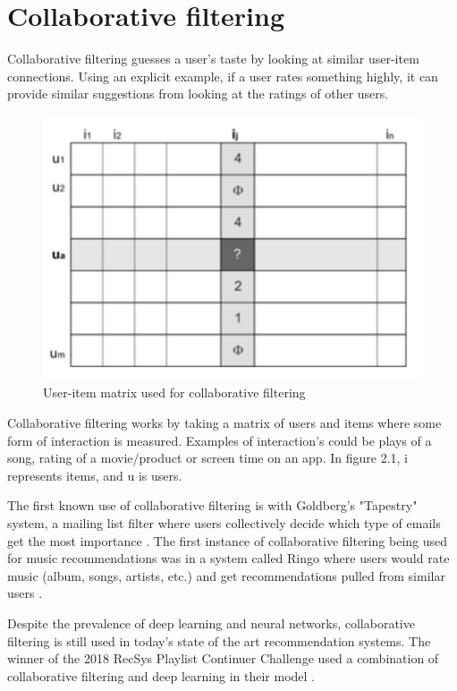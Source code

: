 \section{Collaborative filtering}

Collaborative filtering guesses a user's taste by looking at similar user-item connections. Using an explicit example, if a user rates something highly, it can provide similar suggestions from looking at the ratings of other users\citep{celma_recommendation_2010}.

\begin{figure}[H]
	\includegraphics[scale=0.65]{images/collaborative_filtering}
	\centering
	\caption{User-item matrix used for collaborative filtering \citep{celma_recommendation_2010}} 
	\label{fig:figure}
\end{figure}

Collaborative filtering works by taking a matrix of users and items where some form of interaction is measured. Examples of interaction's could be plays of a song, rating of a movie/product or screen time on an app. In figure 2.1, i represents items, and u is users.

The first known use of collaborative filtering is with Goldberg's "Tapestry" system, a mailing list filter where users collectively decide which type of emails get the most importance \citep{goldberg_using_1992}. The first instance of collaborative filtering being used for music recommendations was in a system called Ringo where users would rate music (album, songs, artists, etc.) and get recommendations pulled from similar users \citep{shardanand_social_1995}. 

Despite the prevalence of deep learning and neural networks, collaborative filtering is still used in today's state of the art recommendation systems. The winner of the 2018  RecSys Playlist Continuer Challenge used a combination of collaborative filtering and deep learning in their model \citep{volkovs_two-stage_2018}.


